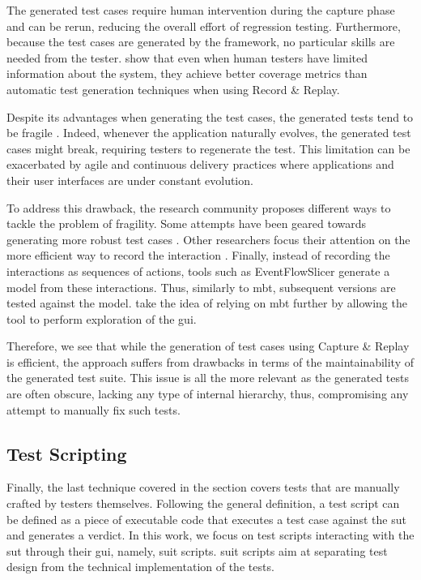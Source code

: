 The generated test cases require human intervention during the capture phase and can be rerun, reducing the overall effort of regression testing. Furthermore, because the test cases are generated by the framework, no particular skills are needed from the tester. \textcite{DiMartino2021} show that even when human testers have limited information about the system, they achieve better coverage metrics than automatic test generation techniques when using Record \& Replay.

Despite its advantages when generating the test cases, the generated tests tend to be fragile \cite{Hammoudi2016}. Indeed, whenever the application naturally evolves, the generated test cases might break, requiring testers to regenerate the test. This limitation can be exacerbated by agile and continuous delivery practices where applications and their user interfaces are under constant evolution.

To address this drawback, the research community proposes different ways to tackle the problem of fragility. Some attempts have been geared towards generating more robust test cases \cite{Hammoudi2016b}. Other researchers focus their attention on the more efficient way to record the interaction \cite{Ronsse1999}. Finally, instead of recording the interactions as sequences of actions, tools such as EventFlowSlicer \cite{Saddler2017} generate a model from these interactions. Thus, similarly to \gls{mbt}, subsequent versions are tested against the model. \textcite{Amalfitano2019} take the idea of relying on \gls{mbt} further by allowing the tool to perform exploration of the \gls{gui}.

Therefore, we see that while the generation of test cases using Capture \& Replay is efficient, the approach suffers from drawbacks in terms of the maintainability of the generated test suite. This issue is all the more relevant as the generated tests are often obscure, lacking any type of internal hierarchy, thus, compromising any attempt to manually fix such tests. 

\subsection{Test Scripting}
\label{sec:introduction-test-scripting}

Finally, the last technique covered in the section covers tests that are manually crafted by testers themselves. Following the general definition, a test script can be defined as a piece of executable code that executes a test case against the \gls{sut} and generates a verdict. In this work, we focus on test scripts interacting with the \gls{sut} through their \gls{gui}, namely, \gls{suit} scripts. \gls{suit} scripts aim at separating test design from the technical implementation of the tests.


